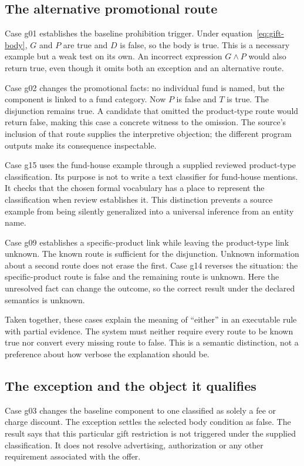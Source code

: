 \subsection{The alternative promotional route}
Case g01 establishes the baseline prohibition trigger. Under
equation~\eqref{eq:gift-body}, $G$ and $P$ are true and $D$ is false, so the
body is true. This is a necessary example but a weak test on its own. An
incorrect expression $G\land P$ would also return true, even though it omits
both an exception and an alternative route.

Case g02 changes the promotional facts: no individual fund is named, but the
component is linked to a fund category. Now $P$ is false and $T$ is true.
The disjunction remains true. A candidate that omitted the product-type route
would return false, making this case a concrete witness to the omission. The
source's inclusion of that route supplies the interpretive objection; the
different program outputs make its consequence inspectable.

Case g15 uses the fund-house example through a supplied reviewed product-type
classification. Its purpose is not to write a text classifier for fund-house
mentions. It checks that the chosen formal vocabulary has a place to represent
the classification when review establishes it. This distinction prevents a
source example from being silently generalized into a universal inference from
an entity name.

Case g09 establishes a specific-product link while leaving the product-type
link unknown. The known route is sufficient for the disjunction. Unknown
information about a second route does not erase the first. Case g14 reverses
the situation: the specific-product route is false and the remaining route is
unknown. Here the unresolved fact can change the outcome, so the correct result
under the declared semantics is unknown.

Taken together, these cases explain the meaning of ``either'' in an executable
rule with partial evidence. The system must neither require every route to be
known true nor convert every missing route to false. This is a semantic
distinction, not a preference about how verbose the explanation should be.

\subsection{The exception and the object it qualifies}
Case g03 changes the baseline component to one classified as solely a fee or
charge discount. The exception settles the selected body condition as false.
The result says that this particular gift restriction is not triggered under
the supplied classification. It does not resolve advertising, authorization or
any other requirement associated with the offer.

